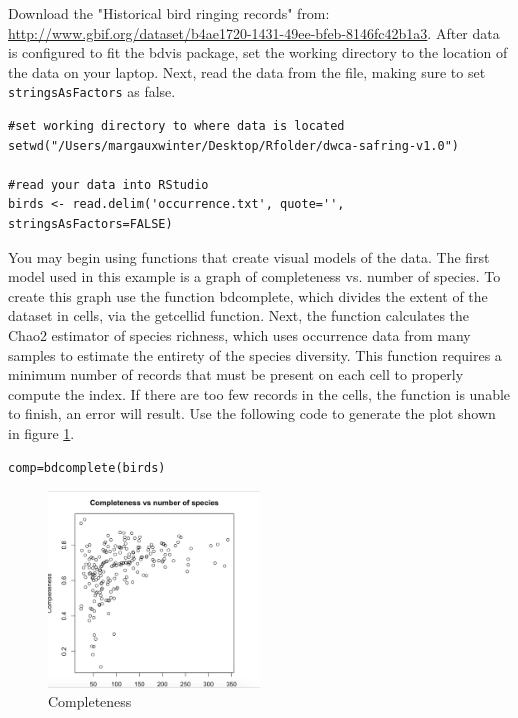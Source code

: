 Download the "Historical bird ringing records" from: \url{http://www.gbif.org/dataset/b4ae1720-1431-49ee-bfeb-8146fc42b1a3}.
After data is configured to fit the bdvis package, set the working directory to the location of the data on your laptop.
Next, read the data from the file, making sure to set \texttt{stringsAsFactors} as false.

\begin{lstlisting}
#set working directory to where data is located
setwd("/Users/margauxwinter/Desktop/Rfolder/dwca-safring-v1.0")

#read your data into RStudio
birds <- read.delim('occurrence.txt', quote='', stringsAsFactors=FALSE)
\end{lstlisting}

You may begin using functions that create visual models of the data.
The first model used in this example is a graph of completeness vs. number of species.
To create this graph use the function bdcomplete, which divides the extent of the dataset in cells, via the getcellid function.
Next, the function calculates the Chao2 estimator of species richness, which uses occurrence data from many samples to estimate the entirety of the species diversity.
This function requires a minimum number of records that must be present on each cell to properly compute the index.
If there are too few records in the cells, the function is unable to finish, an error will result.
Use the following code to generate the plot shown in figure \ref{fig:completeness}.

\begin{lstlisting}
comp=bdcomplete(birds)
\end{lstlisting}

\begin{figure}[htbp!]
   \centering
   \includegraphics[width=0.5\textwidth]{pictures/biodiversity/complete.jpg} 
      \caption{Completeness}
   \label{fig:completeness}
\end{figure} 

